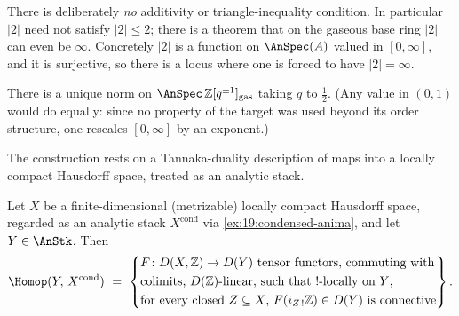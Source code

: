 \begin{remark}
\label{rmk:19:no-triangle}
There is deliberately \emph{no} additivity or triangle-inequality condition. In
particular $|2|$ need not satisfy $|2|\le2$; there is a theorem that on the
gaseous base ring $|2|$ can even be $\infty$. Concretely $|2|$ is a function on
$\AnSpec(A)$ valued in $[0,\infty]$, and it is surjective, so there is a locus
where one is forced to have $|2|=\infty$.
\end{remark}

\begin{theorem}
\label{thm:19:norm-existence}
There is a unique norm on $\AnSpec\,\mathbb Z[q^{\pm1}]_{\mathrm{gas}}$ taking $q$
to $\tfrac12$. (Any value in $(0,1)$ would do equally: since no property of the
target was used beyond its order structure, one rescales $[0,\infty]$ by an
exponent.)
\end{theorem}

The construction rests on a Tannaka-duality description of maps into a locally
compact Hausdorff space, treated as an analytic stack.

\begin{lemma}
\label{lem:19:tanaka}
Let $X$ be a finite-dimensional (metrizable) locally compact Hausdorff space,
regarded as an analytic stack $X^{\mathrm{cond}}$ via \cref{ex:19:condensed-anima},
and let $Y\in\AnStk$. Then
\begin{equation*}
\Homop(Y,\,X^{\mathrm{cond}})\ =\ \left\{
\begin{aligned}
&F\colon D(X,\mathbb Z)\to D(Y)\ \text{tensor functors, commuting with}\\
&\text{colimits, $D(\mathbb Z)$-linear, such that $!$-locally on $Y$,}\\
&\text{for every closed $Z\subseteq X$, } F(i_{Z\,!}\mathbb Z)\in D(Y)
\text{ is connective}
\end{aligned}
\right\}.
\end{equation*}
\end{lemma}

